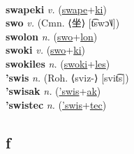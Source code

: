  \label{swapelon} \\
\textbf{swapeki} \textit{v.} (\hyperref[swape]{swape}+\hyperref[ki]{ki})
 \label{swapeki} \\
\textbf{swo} \textit{v.} (Cmn. ⟨坐⟩ [t͡swɔ˥˩])
 \label{swo} \\
\textbf{swolon} \textit{n.} (\hyperref[swo]{swo}+\hyperref[lon]{lon})
 \label{swolon} \\
\textbf{swoki} \textit{v.} (\hyperref[swo]{swo}+\hyperref[ki]{ki})
 \label{swoki} \\
\textbf{swokiles} \textit{n.} (\hyperref[swoki]{swoki}+\hyperref[les]{les})
 \label{swokiles} \\
\textbf{'swis} \textit{n.} (Roh. ⟨sviz-⟩ [svit͡s])
 \label{'swis} \\
\textbf{'swisak} \textit{n.} (\hyperref['swis]{'swis}+\hyperref[ak]{ak})
 \label{'swisak} \\
\textbf{'swistec} \textit{n.} (\hyperref['swis]{'swis}+\hyperref[tec]{tec})
 \label{'swistec} \\
\subsection{f}

